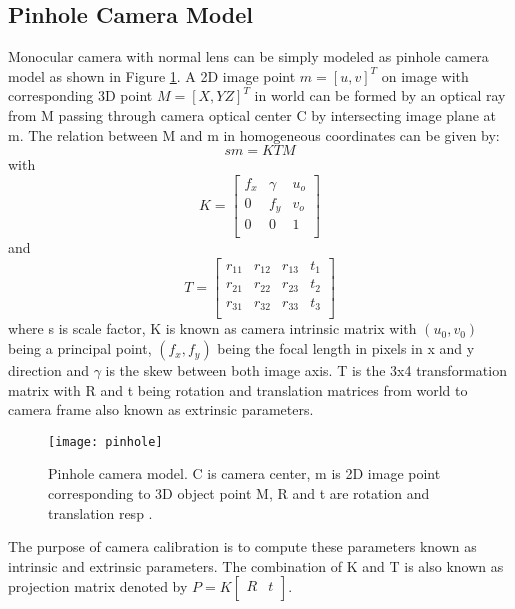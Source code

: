 \subsection{Pinhole Camera Model}
Monocular camera with normal lens can be simply modeled as pinhole camera model as shown in Figure \ref{fig:pinhole}. A 2D image point  $ m = [u,v]^{T} $ on image with corresponding 3D point $ M = [ X,Y Z]^{T} $ in world can be formed by an optical ray from M passing through camera optical center C by intersecting image plane at m. The relation between M and m in homogeneous coordinates can be given by: 
\begin{equation*}
sm= KTM 
\end{equation*} 
with
\begin{equation*}
K = \begin{bmatrix}
f_{x} & \gamma & u_{o} \\
0    &  f_{y} & v_{o} \\
0    &   0    & 1 \\
\end{bmatrix}
\end{equation*} 
and
\begin{equation*}
T = \begin{bmatrix}
r_{11} & r_{12} & r_{13} & t_{1} \\
r_{21} & r_{22} & r_{23} & t_{2} \\
r_{31} & r_{32} & r_{33} & t_{3} \\
\end{bmatrix}
\end{equation*} 
where s is scale factor, K is known as camera intrinsic matrix with $ (u_{0},v_{0}) $ being a principal point, $ (f_{x},f_{y}) $ being the focal length in pixels in x and y direction and $ \gamma $ is the skew between both image axis. T is the 3x4 transformation matrix with R and t being rotation and translation matrices from world to camera frame also known as extrinsic parameters.\\
\begin{figure}[h!]
	\centering
	\texttt{[image: pinhole]}
	\caption{Pinhole camera model. C is camera center, m is 2D image point corresponding to 3D object point M, R and t are rotation and translation resp \cite{cameracalib}.}
	\label{fig:pinhole}
\end{figure}
\newline
The purpose of camera calibration is to compute these parameters known as intrinsic and extrinsic parameters. The combination of K and T is also known as projection matrix denoted by $ P = K \begin{bmatrix} 
            R & t \\
            \end{bmatrix} $.
